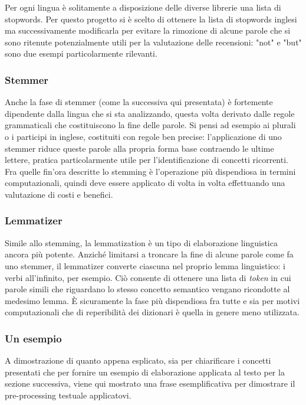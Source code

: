 \documentclass[hidelinks, 12pt]{article}
\begin{document}
Per ogni lingua è solitamente a disposizione delle diverse librerie una lista di stopwords. Per questo progetto si è scelto di ottenere la lista di stopwords inglesi ma successivamente modificarla per evitare la rimozione di alcune parole che si sono ritenute potenzialmente utili per la valutazione delle recensioni: "not" e "but" sono due esempi particolarmente rilevanti.


\subsubsection{Stemmer}

Anche la fase di stemmer (come la successiva qui presentata) è fortemente dipendente dalla lingua che si sta analizzando, questa volta derivato dalle regole grammaticali che costituiscono la fine delle parole. Si pensi ad esempio ai plurali o i participi in inglese, costituiti con regole ben precise: l'applicazione di uno stemmer riduce queste parole alla propria forma base contraendo le ultime lettere, pratica particolarmente utile per l'identificazione di concetti ricorrenti. Fra quelle fin'ora descritte lo stemming è l'operazione più dispendiosa in termini computazionali, quindi deve essere applicato di volta in volta effettuando una valutazione di costi e benefici.


\subsubsection{Lemmatizer}

Simile allo stemming, la lemmatization è un tipo di elaborazione linguistica ancora più potente. Anziché limitarsi a troncare la fine di alcune parole come fa uno stemmer, il lemmatizer converte ciascuna nel proprio lemma linguistico: i verbi all'infinito, per esempio. Ciò consente di ottenere una lista di \textit{token} in cui parole simili che riguardano lo stesso concetto semantico vengano ricondotte al medesimo lemma. È sicuramente la fase più dispendiosa fra tutte e sia per motivi computazionali che di reperibilità dei dizionari è quella in genere meno utilizzata.


\subsubsection{Un esempio}

A dimostrazione di quanto appena esplicato, sia per chiarificare i concetti presentati che per fornire un esempio di elaborazione applicata al testo per la sezione successiva, viene qui mostrato una frase esemplificativa per dimostrare il pre-processing testuale applicatovi.
\end{document}

